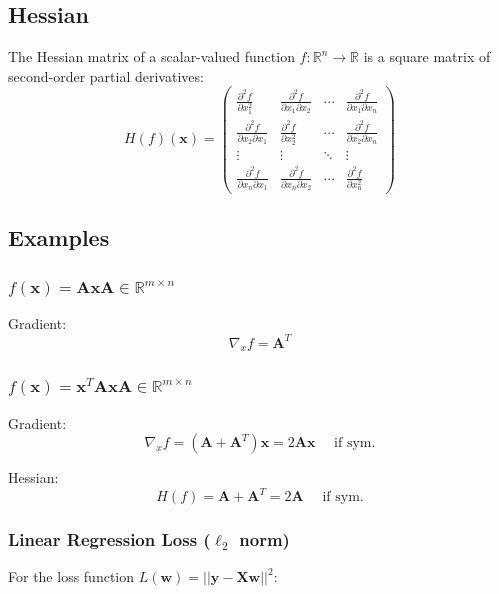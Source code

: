 \documentclass[8pt, a4paper, landscape, includeheadfoot]{extarticle}
\begin{document}
\begin{multicols*}{4}
	\subsection{Hessian}
	The Hessian matrix of a scalar-valued function $f: \mathbb{R}^n \rightarrow \mathbb{R}$ is a square matrix of second-order partial derivatives:
	$$
		H(f)(\mathbf{x}) = \begin{pmatrix}
			\frac{\partial^2 f}{\partial x_1^2}            & \frac{\partial^2 f}{\partial x_1 \partial x_2} & \cdots & \frac{\partial^2 f}{\partial x_1 \partial x_n} \\
			\frac{\partial^2 f}{\partial x_2 \partial x_1} & \frac{\partial^2 f}{\partial x_2^2}            & \cdots & \frac{\partial^2 f}{\partial x_2 \partial x_n} \\
			\vdots                                         & \vdots                                         & \ddots & \vdots                                         \\
			\frac{\partial^2 f}{\partial x_n \partial x_1} & \frac{\partial^2 f}{\partial x_n \partial x_2} & \cdots & \frac{\partial^2 f}{\partial x_n^2}
		\end{pmatrix}
	$$

	\subsection{Examples}

	\subsubsection{\( f(\mathbf{x}) = \mathbf{A}\mathbf{x} \)\hfill $\mathbf{A}\in\mathbb{R}^{m\times n}$}{}

	Gradient:
	$$
		\nabla_x f = \mathbf{A}^T
	$$

	\subsubsection{\( f(\mathbf{x}) = \mathbf{x}^T\mathbf{A}\mathbf{x} \)\hfill $\mathbf{A}\in\mathbb{R}^{m\times n}$}{}

	Gradient:
	$$
		\nabla_x f = (\mathbf{A} + \mathbf{A}^T)\mathbf{x} = 2\mathbf{Ax} \quad \text{ if sym.}
	$$

	Hessian:
	$$
		H(f) = \mathbf{A} + \mathbf{A}^T = 2\mathbf{A}\quad \text{ if sym.}
	$$

	\subsubsection{Linear Regression Loss (\( \ell_2 \) \textbf{norm})}{}
	For the loss function \( L(\mathbf{w}) = ||\mathbf{y} - \mathbf{X}\mathbf{w}||^2 \):


\end{multicols*}
\end{document}
